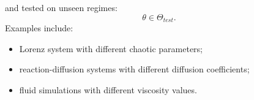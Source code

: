 and tested on unseen regimes: \begin{equation} \theta \in \Theta_{test}. \end{equation} Examples include: \begin{itemize} \item Lorenz system with different chaotic parameters; \item reaction-diffusion systems with different diffusion coefficients; \item fluid simulations with different viscosity values. \end{itemize} %